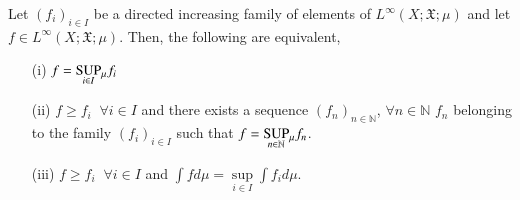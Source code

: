 \begin{proposition}\label{part1:chap3:prop28}
Let $(f_i)_{i \in I}$ be a directed increasing family of elements of
$L^\infty (X; \mathfrak{X}; \mu)$ and let $f \in L^\infty (X;
\mathfrak{X}; \mu)$. Then, the following are equivalent,
\begin{itemize}
\item[{\rm (i)}] $f = \underset{i \in I}{\operatorname{SUP}}{}_\mu f_i$

\item[{\rm (ii)}] $f \geq f_i \;\; \forall i \in I $ and there exists a
  sequence $(f_n)_{n \in \mathbb{N}}$, $\forall n \in\mathbb{N}$ $f_n$
  belonging to the family $(f_i)_{i \in I}$ such that $f = \underset{n
  \in \mathbb{N}}{\operatorname{SUP}}{}_\mu f_n$. 


\item[{\rm (iii)}] $f \geq f_i \;\; \forall i \in I$ and $\int f d\mu =
  \sup\limits_{i \in I} \int f_i d \mu$. 
\end{itemize}
\end{proposition}


